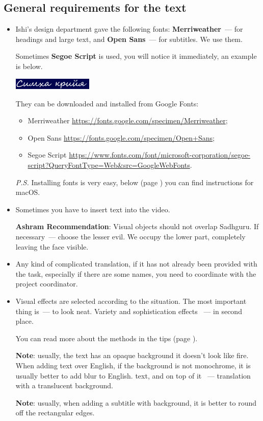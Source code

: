 \documentclass[
a4paper, %
12pt, %
article,
onecolumn, %
openany, %
]{memoir}
\begin{document}
\subsection{General requirements for the text}
\begin{itemize}
\item Ishi's design department gave the following fonts:
\textbf{Merriweather}~--- for headings and large text, and
\textbf{Open Sans}~--- for subtitles. We use them.

Sometimes \textbf{Segoe Script} is used, you will notice it immediately, an example is below.

\includegraphics[width=0.3\textwidth]{segoeScript}

They can be downloaded and installed from Google Fonts:
\begin{itemize}
\item Merriweather
\href{https://fonts.google.com/specimen/Merriweather}{\small https://fonts.google.com/specimen/Merriweather};
\item Open Sans
\href{https://fonts.google.com/specimen/Open+Sans}{\small https://fonts.google.com/specimen/Open+Sans};
\item Segoe Script
\href{https://www.fonts.com/font/microsoft-corporation/segoe-script?QueryFontType=Web&src=GoogleWebFonts}{\small https://www.fonts.com/font/microsoft-corporation/segoe-script?QueryFontType=Web\&src=GoogleWebFonts}.
\end{itemize}

\emph{P.S.} Installing fonts is very easy,
below (page \pageref{fonts}) you can find instructions for macOS.

\item Sometimes you have to insert text into the video.

\textbf{Ashram Recommendation}: Visual objects should not overlap
Sadhguru. If necessary~--- choose the lesser evil. We occupy the lower part,
completely leaving the face visible.

\item Any kind of complicated translation,
{\color{gray} if it has not already been provided with the task},
especially if there are some names, you need to coordinate
with the project coordinator.

\item Visual effects are selected according to the situation.
The most important thing is~--- to look neat. Variety and sophistication
effects ~--- in second place.

You can read more about the methods in the tips (page \pageref{advices}).

\textbf{Note}: usually, the text has an opaque background
it doesn't look like fire. When adding text over English,
if the background is not monochrome, it is usually better to add blur to English.
text, and on top of it ~--- translation with a translucent background.

\textbf{Note}: usually, when adding a subtitle with
background, it is better to round off the rectangular edges.
\end{itemize}
\end{document}
